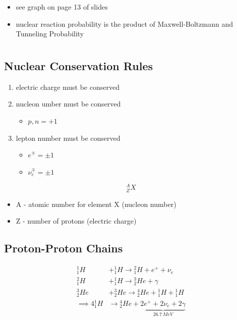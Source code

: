 \documentclass[a4paper,11pt,normalem]{article}
\begin{document}
\begin{itemize}
    \item see graph on page 13 of slides
    \item nuclear reaction probability is the product of Maxwell-Boltzmann and Tunneling Probability
\end{itemize}

\section{}

\subsection{Nuclear Conservation Rules}

\begin{enumerate}
    \item electric charge must be conserved
    \item nucleon umber must be conserved
        \begin{itemize}
            \item \(p, n = + 1\)
        \end{itemize}
    \item lepton number must be conserved
        \begin{itemize}
            \item \(e^\mp = \pm 1\)
            \item \(\nu_{e}^\mp = \pm 1\)
        \end{itemize}
\end{enumerate}

\[
    ^{A}_{Z}X
\]

\begin{itemize}
    \item A - atomic number for element X (nucleon number)
    \item Z - number of protons (electric charge)
\end{itemize}

\subsection{Proton-Proton Chains}

\begin{align*}
    {}^{1}_{1}H &+ {}^{1}_{1}H \to {}^{2}_{1}H + e^+ + \nu_e \\
    {}^{2}_{1}H &+ {}^{1}_{1}H \to {}^{3}_{2}He + \gamma \\
    {}^{3}_{2}He &+ {}^{3}_{2}He \to {}^{4}_{2}He + {}^{1}_{1}H + {}^{1}_{1}H \\
    \implies 4{}^{1}_{1}H &\to {}^{4}_{2}He + \underbrace{2e^+ + 2\nu_e + 2\gamma}_{26.7\,MeV}
\end{align*}
\end{document}
